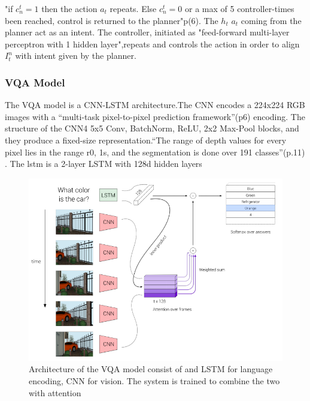 "if \begin{math} c_{n}^{t} = 1 \end{math} then the action \begin{math} a_{t} \end{math} repeats. Else \begin{math} c_{n}^{t} = 0 \end{math} or a max of 5 controller-times been reached, control is returned to the planner"p(6). The \begin{math} h_{t} \end{math}   \begin{math} a_{t} \end{math} coming from the planner act as an intent. The controller, initiated  as "feed-forward multi-layer perceptron with 1 hidden layer",repeats and controls the action in order to align \begin{math}  I_{t}^{n} \end{math} with intent given by the planner. 

\subsubsection{VQA Model}



The VQA model is a CNN-LSTM architecture.The CNN encodes a 224x224 RGB images with a “multi-task pixel-to-pixel prediction framework”(p6) encoding. The structure of the CNN4 {5x5 Conv, BatchNorm, ReLU, 2x2 Max-Pool blocks}, and they produce a fixed-size representation.“The range of depth values for every pixel lies in the range r0, 1s, and the segmentation is done over 191 classes”(p.11) \cite{embodiedqa} . The lstm is a 2-layer LSTM with 128d hidden layers





\begin{figure}[H]
\centering
\includegraphics[scale=0.35]{images/VQA.png}
\caption{Architecture of the VQA model consist of and LSTM for language encoding, CNN for vision. The system is trained to combine the two with attention}
\label{fig:VQ}
\end{figure}




